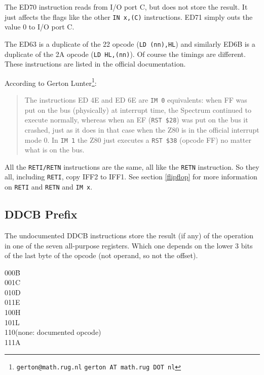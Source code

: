 \documentclass[12pt,twoside,openright,a4paper]{book}
\makeatletter
\newcommand*{\PRINTED}{}	%
\newcommand{\email}[3]{
	\ifdefined\PRINTED
		{\tt #1@#2.#3}
	\else
		{\tt #1 AT #2 DOT #3}
	\fi
}
\makeatother
\begin{document}
The ED70 instruction reads from I/O port C, but does not store the result. It just affects the flags like the other {\tt IN x,(C)} instructions. ED71 simply outs the value 0 to I/O port C.

The ED63 is a duplicate of the 22 opcode ({\tt LD (nn),HL}) and similarly ED6B is a duplicate of the 2A opcode ({\tt LD HL,(nn)}). Of course the timings are different. These instructions are listed in the official documentation.

According to Gerton Lunter\footnote{\email{gerton}{math.rug}{nl}}:

\begin{quote}
	The instructions ED 4E and ED 6E are {\tt IM 0} equivalents: when FF was put on the bus (physically) at interrupt time, the Spectrum continued to execute normally, whereas when an EF ({\tt RST \$28}) was put on the bus it crashed, just as it does in that case when the Z80 is in the official interrupt mode 0. In {\tt IM 1} the Z80 just executes a {\tt RST \$38} (opcode FF) no matter what is on the bus.
\end{quote}

All the {\tt RETI/RETN} instructions are the same, all like the {\tt RETN} instruction. So they all, including {\tt RETI}, copy IFF2 to IFF1. See section \ref{flipflop} for more information on {\tt RETI} and {\tt RETN} and {\tt IM x}.


\subsection{DDCB Prefix}
\label{prefix_cbdd}

The undocumented DDCB instructions store the result (if any) of the operation in one of the seven all-purpose registers. Which one depends on the lower 3 bits of the last byte of the opcode (not operand, so not the offset).

\begin{multicols}{2}
	\begin{tabbing}
		{\qquad}000\quad\=B\\
		{\qquad}001\>C\\
		{\qquad}010\>D\\
		{\qquad}011\>E\\
		{\qquad}100\>H\\
		{\qquad}101\>L\\
		{\qquad}110\>(none: documented opcode)\\
		{\qquad}111\>A
	\end{tabbing}
\end{multicols}
\end{document}
